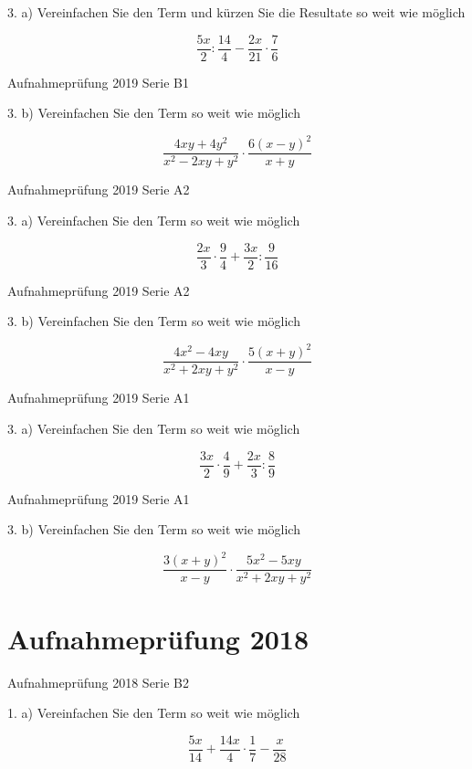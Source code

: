 3. a) Vereinfachen Sie den Term und kürzen Sie die Resultate so weit wie möglich

$$\frac{5x}{2} : \frac{14}{4} - \frac{2x}{21} \cdot{} \frac{7}{6}$$

Aufnahmeprüfung 2019 Serie B1

3. b) Vereinfachen Sie den Term so weit wie möglich

$$\frac{4xy+4y^2}{x^2-2xy+y^2} \cdot{} \frac{6(x-y)^2}{x+y}$$

Aufnahmeprüfung 2019 Serie A2

3. a) Vereinfachen Sie den Term so weit wie möglich

$$\frac{2x}{3} \cdot{} \frac{9}{4} + \frac{3x}{2} : \frac{9}{16}$$

Aufnahmeprüfung 2019 Serie A2

3. b) Vereinfachen Sie den Term so weit wie möglich

$$\frac{4x^2-4xy}{x^2+2xy+y^2} \cdot{} \frac{5(x+y)^2}{x-y}$$

Aufnahmeprüfung 2019 Serie A1

3. a) Vereinfachen Sie den Term so weit wie möglich

$$\frac{3x}2 \cdot{} \frac49 + \frac{2x}3 : \frac89$$

Aufnahmeprüfung 2019 Serie A1

3. b) Vereinfachen Sie den Term so weit wie möglich

$$\frac{3(x+y)^2}{x-y} \cdot{} \frac{5x^2-5xy}{x^2+2xy+y^2}$$

\section*{Aufnahmeprüfung 2018}
Aufnahmeprüfung 2018 Serie B2

1. a) Vereinfachen Sie den Term so weit wie möglich

$$\frac{5x}{14} + \frac{14x}4 \cdot{} \frac17 - \frac{x}{28}$$


